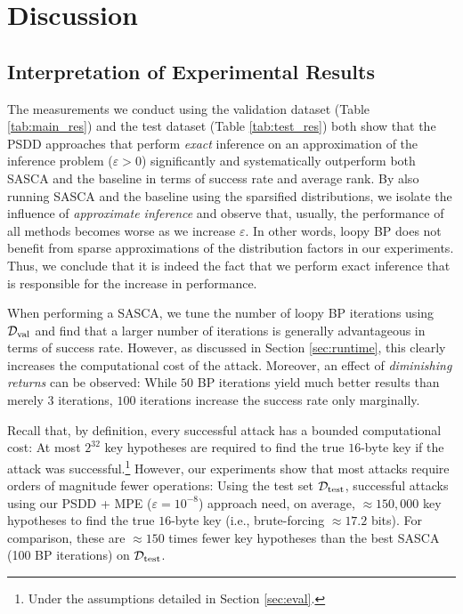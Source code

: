 \chapter{Discussion}
\label{cha:discussion}

\section{Interpretation of Experimental Results}
The measurements we conduct using the validation dataset (Table \ref{tab:main_res}) and the test dataset (Table \ref{tab:test_res}) both show that the PSDD approaches that perform \emph{exact} inference on an approximation of the inference problem ($\varepsilon > 0$) significantly and systematically outperform both SASCA and the baseline in terms of success rate and average rank.
By also running SASCA and the baseline using the sparsified distributions, we isolate the influence of \emph{approximate inference} and observe that, usually, the performance of all methods becomes worse as we increase $\varepsilon$. In other words, loopy BP does not benefit from sparse approximations of the distribution factors in our experiments.
Thus, we conclude that it is indeed the fact that we perform exact inference that is responsible for the increase in performance.

When performing a SASCA, we tune the number of loopy BP iterations using $\mathcal{D}_{\text{val}}$ and find that a larger number of iterations is generally advantageous in terms of success rate. However, as discussed in Section \ref{sec:runtime}, this clearly increases the computational cost of the attack. Moreover, an effect of \emph{diminishing returns} can be observed: While $50$ BP iterations yield much better results than merely $3$ iterations, $100$ iterations increase the success rate only marginally.

Recall that, by definition, every successful attack has a bounded computational cost: At most $2^{32}$ key hypotheses are required to find the true $16$-byte key if the attack was successful.\footnote{Under the assumptions detailed in Section \ref{sec:eval}.} However, our experiments show that most attacks require orders of magnitude fewer operations: Using the test set $\mathcal{D}_{\text{test}}$, successful attacks using our PSDD + MPE ($\varepsilon = 10^{-8}$) approach need, on average, $\approx 150,000$ key hypotheses to find the true $16$-byte key (i.e., brute-forcing $\approx 17.2$ bits). For comparison, these are $\approx 150$ times fewer key hypotheses than the best SASCA (100 BP iterations) on $\mathcal{D}_{\text{test}}$.

